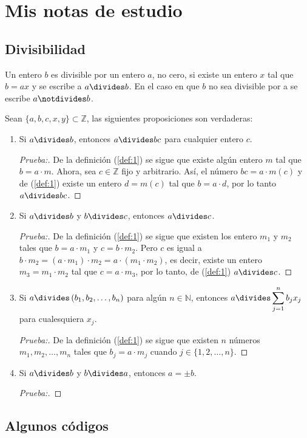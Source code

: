 \chapter*{Mis notas de estudio}
\section*{Divisibilidad}

\begin{definition}
Un entero $b$ es divisible por un entero $a$, no cero, si existe un entero $x$ tal que $b=ax$ y se escribe a $a\divides b$. En el caso en que $b$ no sea divisible por a se escribe $a\notdivides b$.
\end{definition}

\begin{theorem}
\noindent
Sean $\{a,b,c,x,y\}\subset\mathbb{Z}$, las siguientes proposiciones son verdaderas:
\begin{enumerate}[font={\bfseries},label={1)}]\label{def:1}
	\item Si $a\divides b$, entonces $a\divides bc$ para cualquier entero $c$.
	
	\begin{proof}[Prueba:]
	\noindent
	
	De la definición (\ref{def:1}) se sigue que existe algún entero $m$ tal que $b=a\cdot m$. Ahora, sea $c\in\mathbb{Z}$ fijo y arbitrario. Así, el número $bc=a\cdot m(c)$ y de (\ref{def:1}) existe un entero $d=m(c)$ tal que $b=a\cdot d$, por lo tanto $a\divides bc$.
	\end{proof}

	\item Si $a\divides b$ y $b\divides c$, entonces $a\divides c$.
	
	\begin{proof}[Prueba:]
	\noindent
	
	De la definición (\ref{def:1}) se sigue que existen los entero $m_1$ y $m_2$ tales que $b=a\cdot m_1$ y $c=b\cdot m_2$. Pero $c$ es igual a $b\cdot m_2=(a\cdot m_1)\cdot m_2=a\cdot(m_1\cdot m_2)$, es decir, existe un entero $m_3=m_1\cdot m_2$ tal que $c=a\cdot m_3$, por lo tanto, de (\ref{def:1}) $a\divides c$. 
	\end{proof}

	\item Si $a\divides \left(b_1,b_2,\ldots,b_n\right)$ para algún $n\in\mathbb{N}$, entonces $a\divides \displaystyle\sum_{j=1}^{n}b_jx_j$ para cualesquiera $x_j$.
	
	\begin{proof}[Prueba:]
	\noindent
	
	De la definición (\ref{def:1}) se sigue que existen $n$ números $m_1,m_2,\ldots, m_n$ tales que $b_j=a\cdot m_j$ cuando $j\in\{1,2,\ldots,n\}$.
	\end{proof}

	\item Si $a\divides b$ y $b\divides a$, entonces $a=\pm b$.
	
	\begin{proof}[Prueba:]
	\noindent
	
	\end{proof}
\end{enumerate}
\end{theorem}

\section*{Algunos códigos}

\inputminted{python}{totient2.py}